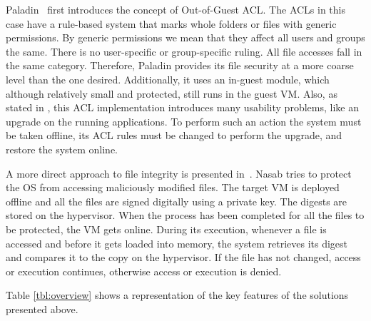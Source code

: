 \par Paladin~\cite{baliga2008automated} first introduces the concept of Out-of-Guest \ac{ACL}. The \acp{ACL} in this case have a rule-based system that marks whole folders or files with generic permissions. By generic permissions we mean that they affect all users and groups the same. There is no user-specific or group-specific ruling. All file accesses fall in the same category. Therefore, Paladin provides its file security at a more coarse level than the one desired. Additionally, it uses an in-guest module, which although relatively small and protected, still runs in the guest \ac{VM}. Also, as stated in \cite{baliga2008automated}, this \ac{ACL} implementation introduces many usability problems, like an upgrade on the running applications. To perform such an action the system must be taken offline, its \ac{ACL} rules must be changed to perform the upgrade, and restore the system online. 

\par A more direct approach to file integrity is presented in~\cite{nasab2012security}. Nasab tries to protect the \ac{OS} from accessing maliciously modified files. The target \ac{VM} is deployed offline and all the files are signed digitally using a private key. The digests are stored on the hypervisor. When the process has been completed for all the files to be protected, the \ac{VM} gets online. During its execution, whenever a file is accessed and before it gets loaded into memory, the system retrieves its digest and compares it to the copy on the hypervisor. If the file has not changed, access or execution continues, otherwise access or execution is denied.

\par Table \ref{tbl:overview} shows a representation of the key features of the solutions presented above.

